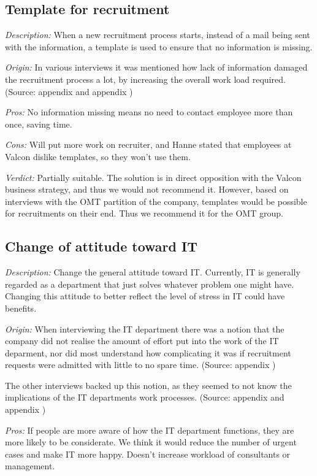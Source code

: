 \subsection{Template for recruitment}
\emph{Description:} When a new recruitment process starts, instead of a mail being sent with the information, a template is used to ensure that no information is missing.

\emph{Origin:}
In various interviews it was mentioned how lack of information damaged the recruitment process a lot, by increasing the overall work load required.
(Source: appendix  and appendix )

\noindent \emph{Pros:} No information missing means no need to contact employee more than once, saving time.

\noindent \emph{Cons:} Will put more work on recruiter, and Hanne stated that employees at Valcon dislike templates, so they won't use them.

\emph{Verdict:}
Partially suitable. The solution is in direct opposition with the Valcon business strategy, and thus we would not recommend it. However, based on interviews with the OMT partition of the company, templates would be possible for recruitments on their end. Thus we recommend it for the OMT group.

\subsection{Change of attitude toward IT}
\emph{Description:} Change the general attitude toward IT. Currently, IT is generally regarded as a department that just solves whatever problem one might have. Changing this attitude to better reflect the level of stress in IT could have benefits.

\emph{Origin:}
When interviewing the IT department there was a notion that the company did not realise the amount of effort put into the work of the IT deparment, nor did most understand how complicating it was if recruitment requests were admitted with little to no spare time.
(Source: appendix )

The other interviews backed up this notion, as they seemed to not know the implications of the IT departments work processes.
(Source: appendix  and appendix )

\noindent \emph{Pros:} If people are more aware of how the IT department functions, they are more likely to be considerate. We think it would reduce the number of urgent cases and make IT more happy. Doesn't increase workload of consultants or management.

